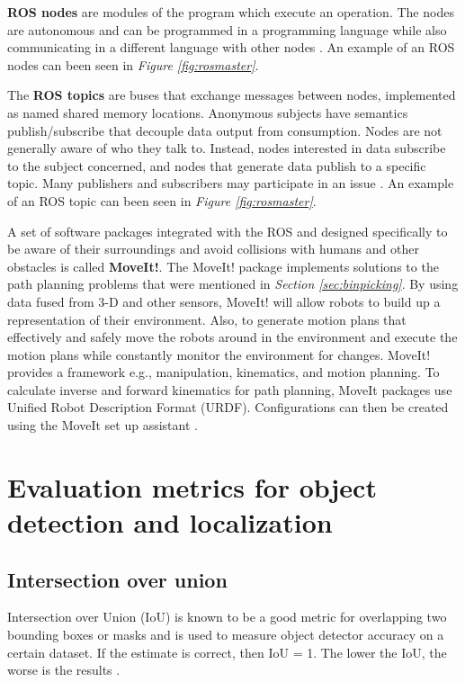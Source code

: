 \textbf{ROS nodes} are modules of the program which execute an operation. 
The nodes are autonomous and can be programmed in a programming language while also communicating in a different language with other nodes \cite{meier_understanding_2019}. An example of an ROS nodes can been seen in \textit{Figure \ref{fig:rosmaster}}.


The \textbf{ROS topics} are buses that exchange messages between nodes, implemented as named shared memory locations. Anonymous subjects have semantics publish/subscribe that decouple data output from consumption. Nodes are not generally aware of who they talk to. Instead, nodes interested in data subscribe to the subject concerned, and nodes that generate data publish to a specific topic. Many publishers and subscribers may participate in an issue \cite{foote_topics_2019}. An example of an ROS topic can been seen in \textit{Figure \ref{fig:rosmaster}}.

A set of software packages integrated with the ROS and designed specifically to be aware of their surroundings and avoid collisions with humans and other obstacles is called \textbf{MoveIt!}. The MoveIt! package implements solutions to the path planning problems that were mentioned in \textit{Section \ref{sec:binpicking}}. 
By using data fused from 3-D and other sensors, MoveIt! will allow robots to build up a representation of their environment. Also, to generate motion plans that effectively and safely move the robots around in the environment and execute the motion plans while constantly monitor the environment for changes. 
MoveIt! provides a framework e.g., manipulation, kinematics, and motion planning. To calculate inverse and forward kinematics for path planning, MoveIt packages use Unified Robot Description Format (URDF). Configurations can then be created using the MoveIt set up assistant \cite{chitta_moveit_2012}.

\section{Evaluation metrics for object detection and localization}
\subsection{Intersection over union}
Intersection over Union (IoU) is known to be a good metric for overlapping two bounding boxes or masks and is used to measure object detector accuracy on a certain dataset. If the estimate is correct, then IoU = 1. The lower the IoU, the worse is the results \cite{sheremet_intersection_2020}.

